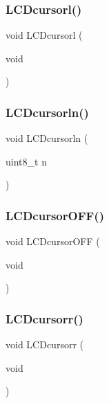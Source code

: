 \subsubsection{L\+C\+Dcursorl()}
{\footnotesize\ttfamily void L\+C\+Dcursorl (\begin{DoxyParamCaption}\item[{void}]{ }\end{DoxyParamCaption})}

\mbox{\label{lcd_8c_ad6a50d005dbb41ca81485b9a55750c5e}} 
\subsubsection{L\+C\+Dcursorln()}
{\footnotesize\ttfamily void L\+C\+Dcursorln (\begin{DoxyParamCaption}\item[{uint8\+\_\+t}]{n }\end{DoxyParamCaption})}

\mbox{\label{lcd_8c_aceae492825d39eec0d2497f6072b1740}} 
\subsubsection{L\+C\+Dcursor\+O\+F\+F()}
{\footnotesize\ttfamily void L\+C\+Dcursor\+O\+FF (\begin{DoxyParamCaption}\item[{void}]{ }\end{DoxyParamCaption})}

\mbox{\label{lcd_8c_a4bea2eb4679aa54a409489209e86c5c1}} 
\subsubsection{L\+C\+Dcursorr()}
{\footnotesize\ttfamily void L\+C\+Dcursorr (\begin{DoxyParamCaption}\item[{void}]{ }\end{DoxyParamCaption})}

\mbox{\label{lcd_8c_a86d1b4b762394ca1a366e75d3511a056}} 
